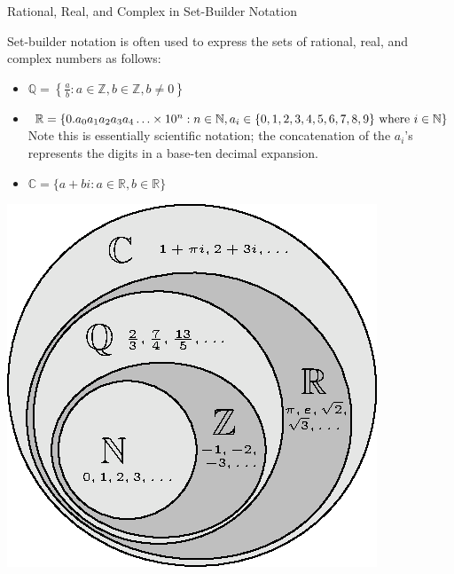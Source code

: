 \begin{example}{Rational, Real, and Complex in Set-Builder Notation }

Set-builder notation is often used to express the sets of rational, real, and complex numbers as follows:
\begin{itemize}
\item $\mathbb{Q}=\left\lbrace \frac{a}{b}: a\in \mathbb{Z}, b\in\mathbb{Z},b\neq 0 \right\rbrace$
\item $\mathbb{R}=\left\lbrace 0.a_0a_1a_2a_3a_4\ldots \times 10^n : n\in \mathbb{N}, a_i\in\lbrace 0,1,2,3,4,5,6,7,8,9\rbrace \textnormal{ where } i \in \mathbb{N} \right\rbrace$  Note this is essentially scientific notation; the concatenation of the $a_i$'s represents the digits in a base-ten decimal expansion. 
\item $\mathbb{C}=\lbrace a+bi: a\in \mathbb{R}, b\in\mathbb{R} \rbrace$

\end{itemize}
\begin{center}
\includegraphics[scale=1]{NumberNotation.eps}
\end{center}
\end{example}